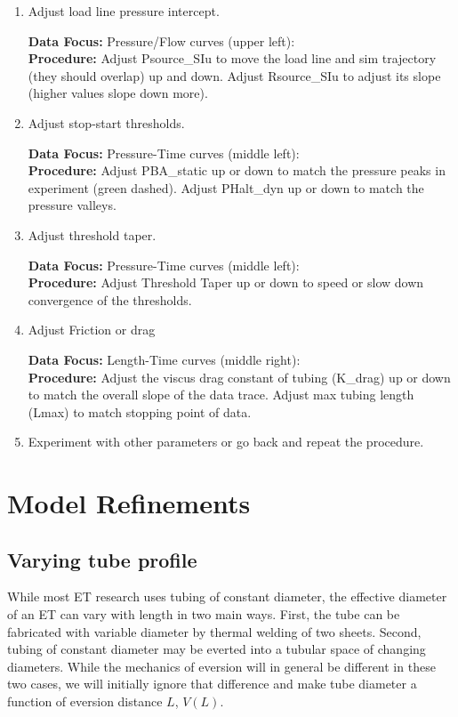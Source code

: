 \documentclass[letterpaper]{article}
\begin{document}
\begin{enumerate}
    \item  Adjust load line pressure intercept.

    {\bf Data Focus: } Pressure/Flow curves (upper left):\\
    {\bf Procedure: } Adjust Psource\_SIu to move the load line and sim trajectory (they should overlap)
    up and down.  Adjust Rsource\_SIu to adjust its slope (higher values slope down more).

    \item Adjust stop-start thresholds.

     {\bf Data Focus: } Pressure-Time curves (middle left):\\
    {\bf Procedure: } Adjust PBA\_static up or down to match the pressure peaks in experiment (green dashed).
    Adjust PHalt\_dyn  up or down to match the pressure valleys.

    \item Adjust threshold taper.

     {\bf Data Focus: } Pressure-Time curves (middle left):\\
    {\bf Procedure: } Adjust Threshold Taper up or down to speed or slow down convergence of the thresholds.

    \item Adjust Friction or drag

     {\bf Data Focus: } Length-Time curves (middle right):\\
    {\bf Procedure: } Adjust the viscus drag constant of tubing (K\_drag) up or down to match the overall slope
    of the data trace.
    Adjust max tubing length (Lmax) to match stopping point of data.

    \item Experiment with other parameters or go back and repeat the procedure.

\end{enumerate}


\section{Model Refinements}

\subsection{Varying tube profile}

While most ET research uses tubing of constant diameter, the effective diameter of an ET can vary with
length in two main ways.   First, the tube can be fabricated with variable diameter by thermal welding of two sheets.
Second, tubing of constant diameter may be everted into a tubular space of changing diameters.
While the mechanics of eversion will in general be different in these two cases, we will initially ignore that difference
and make tube diameter a function of eversion distance $L$, $V(L)$.
\end{document}
